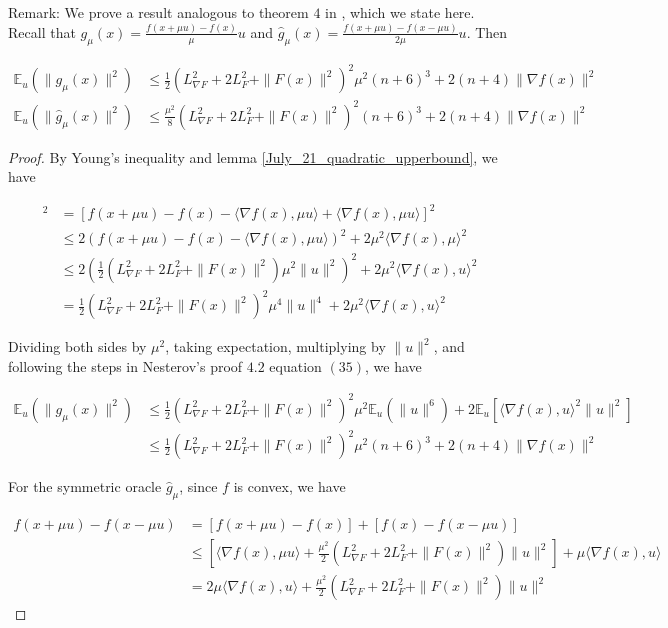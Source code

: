\documentclass{article}
\begin{document}
\begin{theorem} \label{Theorem_July_21_second_moment}
Remark: We prove a result analogous to theorem $4$ in \cite{Nesterov2015}, which we state here. Recall that $g_{\mu}(x) = \frac{f(x+\mu u)-f(x)}{\mu}u$ and $\hat{g}_{\mu}(x) = \frac{f(x+\mu u)-f(x-\mu u)}{2\mu}u$. Then

\begin{align}
\mathbb{E}_u(\|g_{\mu}(x)\|^2) & \leq \frac{1}{2}(L_{\nabla F}^2 + 2L_F^2 + \|F(x)\|^2)^2\mu^2(n+6)^3 + 2(n+4)\|\nabla f(x)\|^2 \\ \mathbb{E}_u(\|\hat{g}_{\mu}(x)\|^2) & \leq \frac{\mu^2}{8}(L_{\nabla F}^2 + 2L_F^2 + \|F(x)\|^2)^2(n+6)^3 + 2(n+4)\|\nabla f(x)\|^2
\end{align}

\begin{proof}
By Young's inequality and lemma \ref{July_21_quadratic_upperbound}, we have 

\begin{align*}
[f(x+\mu u) - f(x)]^2 & = [f(x+\mu u) - f(x) - \langle \nabla f(x), \mu u\rangle + \langle \nabla f(x), \mu u\rangle ]^2 \\ & \leq 2(f(x+\mu u) - f(x) - \langle \nabla f(x), \mu u\rangle)^2 + 2\mu^2\langle \nabla f(x),\mu\rangle^2  \\ & \leq 2\left(\frac{1}{2}(L_{\nabla F}^2 + 2L_F^2 + \|F(x)\|^2)\mu^2 \|u\|^2\right)^2 + 2\mu^2 \langle \nabla f(x),u\rangle^2 \\ & = \frac{1}{2}(L_{\nabla F}^2 + 2L_F^2 + \|F(x)\|^2)^2\mu^4 \|u\|^4 + 2\mu^2 \langle \nabla f(x),u\rangle^2
\end{align*}

Dividing both sides by $\mu^2$, taking expectation, multiplying by $\|u\|^2$, and following the steps in Nesterov's proof $4.2$ equation $(35)$, we have 

\begin{align*}
\mathbb{E}_u(\|g_{\mu}(x)\|^2) & \leq \frac{1}{2}(L_{\nabla F}^2 + 2L_F^2 + \|F(x)\|^2)^2\mu^2\mathbb{E}_u(\|u\|^6) + 2\mathbb{E}_u[\langle  \nabla f(x),u \rangle^2\|u\|^2] \\ & \leq \frac{1}{2}(L_{\nabla F}^2 + 2L_F^2 + \|F(x)\|^2)^2 \mu^2 (n+6)^3 + 2(n+4)\|\nabla f(x)\|^2
\end{align*}

For the symmetric oracle $\hat{g}_{\mu}$, since $f$ is convex, we have 

\begin{align*}
f(x+\mu u) - f(x-\mu u) & = [f(x+\mu u) - f(x)] + [f(x) - f(x-\mu u)] \\ & \leq [\langle \nabla f(x),\mu u\rangle + \frac{\mu^2}{2}(L_{\nabla F}^2 + 2L_F^2 + \|F(x)\|^2)\|u\|^2] + \mu \langle \nabla f(x),u\rangle  \\ & = 2\mu\langle \nabla f(x),u\rangle + \frac{\mu^2}{2}(L_{\nabla F}^2 + 2L_F^2 + \|F(x)\|^2)\|u\|^2
\end{align*}


\end{proof}
\end{theorem}
\end{document}
